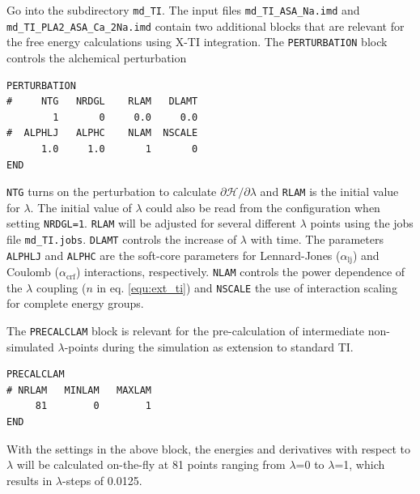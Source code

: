 Go into the subdirectory \texttt{md\_TI}. The input files \texttt{md\_TI\_ASA\_Na.imd} and \texttt{md\_TI\_PLA2\_ASA\_Ca\_2Na.imd} contain two additional blocks that are relevant for the free energy calculations using X-TI integration. The \texttt{PERTURBATION} block controls the alchemical perturbation 
\begin{lstlisting}
PERTURBATION
#     NTG   NRDGL    RLAM   DLAMT 
        1       0     0.0     0.0 
#  ALPHLJ   ALPHC    NLAM  NSCALE 
      1.0     1.0       1       0 
END
\end{lstlisting}
\texttt{NTG} turns on the perturbation to calculate $\partial\mathcal{H}/\partial\lambda$ and \texttt{RLAM} is the initial value for $\lambda$. The initial value of $\lambda$ could also be read from the configuration when setting \texttt{NRDGL=1}. \texttt{RLAM} will be adjusted for several different $\lambda$ points using the jobs file \texttt{md\_TI.jobs}. \texttt{DLAMT} controls the increase of $\lambda$ with time. The parameters \texttt{ALPHLJ} and \texttt{ALPHC} are the soft-core parameters for Lennard-Jones ($\alpha_{\text{lj}}$) and Coulomb ($\alpha_{\text{crf}}$) interactions, respectively. \texttt{NLAM} controls the power dependence of the $\lambda$ coupling ($n$ in eq. \ref{equ:ext_ti}) and \texttt{NSCALE} the use of interaction scaling for complete energy groups.  

The \texttt{PRECALCLAM} block is relevant for the pre-calculation of intermediate non-simulated $\lambda$-points during the simulation as extension to standard TI. 
\begin{lstlisting}
PRECALCLAM
# NRLAM   MINLAM   MAXLAM
     81        0        1
END
\end{lstlisting}
With the settings in the above block, the energies and derivatives with respect to $\lambda$ will be calculated on-the-fly at 81 points ranging from $\lambda$=0 to $\lambda$=1, which results in $\lambda$-steps of 0.0125.


